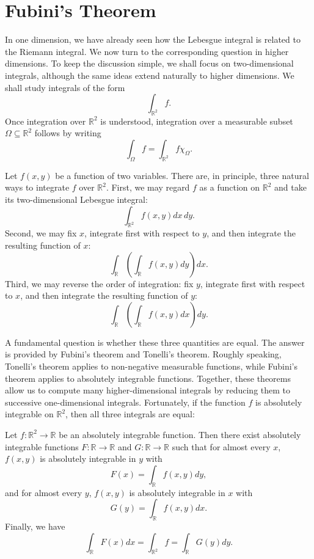 \section{Fubini's Theorem}

In one dimension, we have already seen how the Lebesgue integral is related to the Riemann integral. We now turn to the corresponding question in higher dimensions. To keep the discussion simple, we shall focus on two-dimensional integrals, although the same ideas extend naturally to higher dimensions. We shall study integrals of the form
$$\int_{\mathbb{R}^{2}}f.$$
Once integration over $\mathbb{R}^{2}$ is understood, integration over a measurable subset $\Omega\subseteq\mathbb{R}^{2}$ follows by writing
$$\int_{\Omega}f=\int_{\mathbb{R}^{2}}f\chi_{\Omega}.$$

Let $f(x,y)$ be a function of two variables. There are, in principle, three natural ways to integrate $f$ over $\mathbb{R}^{2}$. First, we may regard $f$ as a function on $\mathbb{R}^{2}$ and take its two-dimensional Lebesgue integral:
$$\int_{\mathbb{R}^{2}}f(x,y)dx\,dy.$$
Second, we may fix $x$, integrate first with respect to $y$, and then integrate the resulting function of $x$:
$$\int_{\mathbb{R}}\left(\int_{\mathbb{R}}f(x,y)dy\right)dx.$$
Third, we may reverse the order of integration: fix $y$, integrate first with respect to $x$, and then integrate the resulting function of $y$:
$$\int_{\mathbb{R}}\left(\int_{\mathbb{R}}f(x,y)dx\right)dy.$$

A fundamental question is whether these three quantities are equal. The answer is provided by Fubini's theorem and Tonelli's theorem. Roughly speaking, Tonelli's theorem applies to non-negative measurable functions, while Fubini's theorem applies to absolutely integrable functions. Together, these theorems allow us to compute many higher-dimensional integrals by reducing them to successive one-dimensional integrals. Fortunately, if the function $f$ is absolutely integrable on $\mathbb{R}^{2}$, then all three integrals are equal:

\begin{theorem}
Let $f:\mathbb{R}^{2}\rightarrow\mathbb{R}$ be an absolutely integrable function. Then there exist absolutely integrable functions $F:\mathbb{R}\rightarrow\mathbb{R}$ and $G:\mathbb{R}\rightarrow\mathbb{R}$ such that for almost every $x$, $f(x,y)$ is absolutely integrable in $y$ with
$$F(x)=\int_{\mathbb{R}}f(x,y)dy,$$
and for almost every $y$, $f(x,y)$ is absolutely integrable in $x$ with
$$G(y)=\int_{\mathbb{R}}f(x,y)dx.$$
Finally, we have
$$\int_{\mathbb{R}}F(x)dx=\int_{\mathbb{R}^{2}}f=\int_{\mathbb{R}}G(y)dy.$$
\end{theorem}

